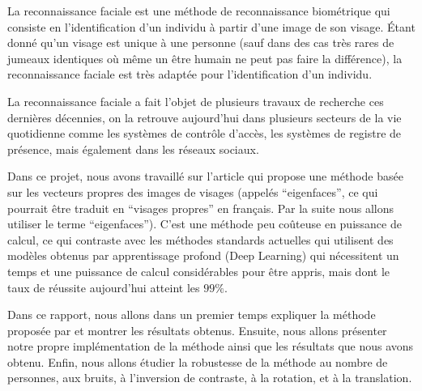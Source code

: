 La reconnaissance faciale est une méthode de reconnaissance biométrique
qui consiste en l'identification d'un individu à partir d'une image de son
visage. Étant donné qu'un visage est unique à une personne (sauf dans des cas très
rares de jumeaux identiques où même un être humain ne peut pas faire 
la différence), la reconnaissance faciale est très adaptée pour l'identification
d'un individu.

La reconnaissance faciale a fait l'objet de plusieurs travaux de recherche ces dernières décennies,
on la retrouve aujourd'hui dans plusieurs secteurs de la vie quotidienne comme les systèmes de
contrôle d'accès, les systèmes de registre de présence, mais également dans les réseaux sociaux.

Dans ce projet, nous avons travaillé sur l'article \cite{article} qui propose une méthode
basée sur les vecteurs propres des images de visages (appelés ``eigenfaces'', ce qui pourrait être 
traduit en ``visages propres'' en français. Par la suite nous allons utiliser le terme ``eigenfaces'').
C'est une méthode peu coûteuse en puissance de calcul, ce qui contraste avec les méthodes standards
actuelles qui utilisent des modèles obtenus par apprentissage profond (Deep Learning) qui nécessitent un
temps et une puissance de calcul considérables pour être appris, mais dont le taux de réussite aujourd'hui
atteint les $99\%$.

Dans ce rapport, nous allons dans un premier temps expliquer la méthode proposée par \cite{article} et
montrer les résultats obtenus. Ensuite, nous allons présenter notre propre implémentation de la méthode
ainsi que les résultats que nous avons obtenu. Enfin, nous allons étudier la robustesse de la méthode
au nombre de personnes, aux bruits, à l'inversion de contraste, à la rotation, et à la translation.